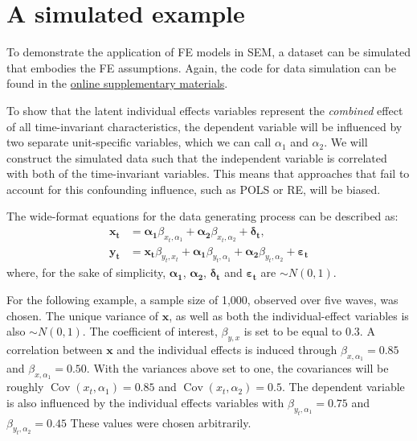 \documentclass[]{interact}
\theoremstyle{plain}%
\theoremstyle{definition}
\theoremstyle{remark}
\begin{document}
\doublespacing

\hypertarget{ex1}{%
\section{A simulated example}\label{ex1}}

To demonstrate the application of FE models in SEM, a dataset can be
simulated that embodies the FE assumptions. Again, the code for data
simulation can be found in the
\href{https://github.com/henrik-andersen/FE-SEM/blob/master/simulation-code.R}{online
supplementary materials}.

To show that the latent individual effects variables represent the
\emph{combined} effect of all time-invariant characteristics, the
dependent variable will be influenced by two separate unit-specific
variables, which we can call \(\alpha_{1}\) and \(\alpha_{2}\). We will
construct the simulated data such that the independent variable is
correlated with both of the time-invariant variables. This means that
approaches that fail to account for this confounding influence, such as
POLS or RE, will be biased.

The wide-format equations for the data generating process can be
described as: \begin{align}
\bm{x_{t}} & = \bm{\alpha_{1}}\beta_{x_{t},\alpha_{1}} + \bm{\alpha_{2}}\beta_{x_{t},\alpha_{2}} + \bm{\delta_{t}}, \\
\bm{y_{t}} & = \bm{x_{t}}\beta_{y_{t},x_{t}} + \bm{\alpha_{1}}\beta_{y_{t},\alpha_{1}} + \bm{\alpha_{2}} \beta_{y_{t},\alpha_{2}} + \bm{\varepsilon_{t}} 
\end{align} where, for the sake of simplicity, \(\bm{\alpha_{1}}\),
\(\bm{\alpha_{2}}\), \(\bm{\delta_{t}}\) and \(\bm{\varepsilon_{t}}\)
are \(\sim N(0,1)\).

For the following example, a sample size of 1,000, observed over five
waves, was chosen. The unique variance of \(\bm{x}\), as well as both
the individual-effect variables is also \(\sim N(0,1)\). The coefficient
of interest, \(\beta_{y,x}\) is set to be equal to \(0.3\). A
correlation between \(\bm{x}\) and the individual effects is induced
through \(\beta_{x,\alpha_{1}} = 0.85\) and
\(\beta_{x,\alpha_{1}} = 0.50\). With the variances above set to one,
the covariances will be roughly
\(\mathop{\mathrm{\mathrm{Cov}}}(x_{t},\alpha_{1}) = 0.85\) and
\(\mathop{\mathrm{\mathrm{Cov}}}(x_{t},\alpha_{2}) = 0.5\). The
dependent variable is also influenced by the individual effects
variables with \(\beta_{y_{t},\alpha_{1}} = 0.75\) and
\(\beta_{y_{t},\alpha_{2}} = 0.45\) These values were chosen
arbitrarily.
\end{document}
